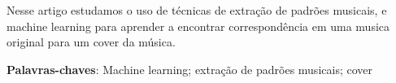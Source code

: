 
\par

\begin{resumo}

Nesse artigo estudamos o uso de técnicas de extração de padrões musicais, e machine learning para aprender a encontrar correspondência em uma musica original para um cover da música.
	
\vspace{\onelineskip} 
	
\noindent

\textbf{Palavras-chaves}: Machine learning; extração de padrões musicais; cover

\end{resumo}




